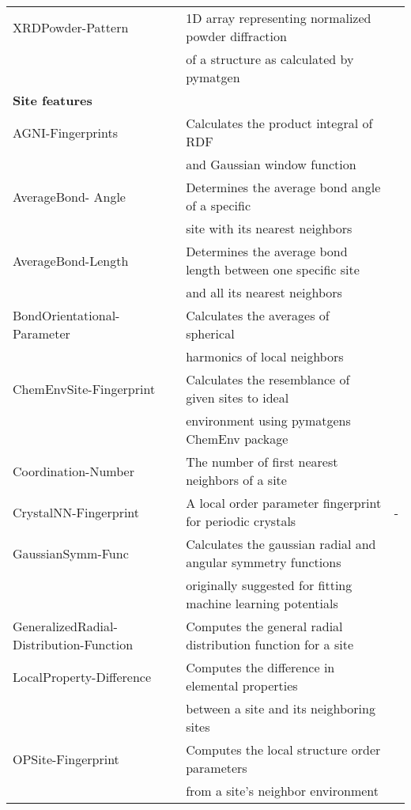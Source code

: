\begin{center}
\begin{longtable}{M{4.0cm} M{7.5cm} M{2.0cm}}
  XRDPowder-Pattern & 1D array representing normalized powder diffraction & \cite{Ong2013} \\ 
   &of a structure as calculated by pymatgen  & \\ 
    \hline 
  \textbf{Site features} & & \\
  AGNI-Fingerprints & Calculates the product integral of RDF & \cite{Botu2014}  \\    
   & and Gaussian window function  & \\ 
  AverageBond- Angle & Determines the average bond angle of a specific  & \cite{Jong2016}  \\
   & site with its nearest neighbors  & \\ 
  AverageBond-Length & Determines the average bond length between one specific site & \cite{Jong2016}  \\ 
   & and all its nearest neighbors  & \\ 
  BondOrientational-Parameter & Calculates the averages of spherical  & \cite{Seko2017, Steinhardt1983}  \\ 
   & harmonics of local neighbors & \\ 
  ChemEnvSite-Fingerprint & Calculates the resemblance of given sites to ideal & \cite{Waroquiers2017, Zimmermann2017}  \\   
   & environment using pymatgens ChemEnv package  & \\ 
  Coordination-Number & The number of first nearest neighbors of a site & \cite{Zimmermann2017}  \\
  CrystalNN-Fingerprint & A local order parameter fingerprint for periodic crystals & -  \\   
  GaussianSymm-Func & Calculates the gaussian radial and angular symmetry functions  & \cite{Behler2011,Khorshidi2016}  \\   
   & originally suggested for fitting machine learning potentials &  \\ 
  GeneralizedRadial-Distribution-Function & Computes the general radial distribution function for a site & \cite{Seko2017}  \\   
  LocalProperty-Difference & Computes the difference in elemental properties  & \cite{Ward2017, Jong2016} \\   
   & between a site and its neighboring sites & \\ 
  OPSite-Fingerprint & Computes the local structure order parameters & \cite{Zimmermann2017} \\   
   & from a site's neighbor environment  & \\ 

\end{longtable}
\end{center}
